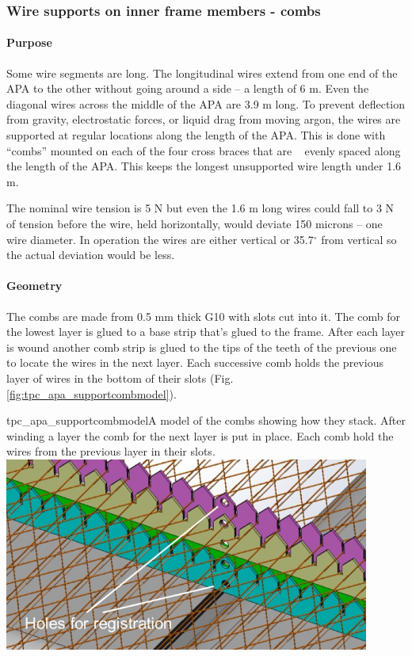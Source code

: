 \subsubsection{Wire supports on inner frame members - combs}

\paragraph{Purpose}

Some wire segments are long.  The longitudinal wires extend from one end of the APA to the other without going around a side -- a length of 6 m.  Even the diagonal wires across the middle of the APA are 3.9 m long.  To prevent deflection from gravity, electrostatic forces, or liquid drag from moving argon, the wires are supported at regular locations along the length of the APA.  This is done with ``combs'' mounted on each of the four cross braces that are ~ evenly spaced along the length of the APA.  This keeps the longest unsupported wire length under 1.6 m.

The nominal wire tension is 5 N but even the 1.6 m long wires could fall to 3 N of tension before the wire, held horizontally, would deviate 150 microns -- one wire diameter.  In operation the wires are either vertical or 35.7$^{\circ}$ from vertical so the actual deviation would be less.

\paragraph{Geometry}

The combs are made from 0.5 mm thick G10 with slots cut into it.  The comb for the lowest layer is glued to a base strip that's glued to the frame.  After each layer is wound another comb strip is glued to the tips of the teeth of the previous one to locate the wires in the next layer.  Each successive comb holds the previous layer of wires in the bottom of their slots (Fig. \ref{fig:tpc_apa_supportcombmodel}).

\begin{cdrfigure}{tpc_apa_supportcombmodel}{A model of the combs showing how they stack.  After winding a layer the comb for the next layer is put in place.  Each comb hold the wires from the previous layer in their slots.}
\includegraphics[width=0.9\textwidth]{figures/tpc_apa_supportcombmodel.png} 
\end{cdrfigure}

